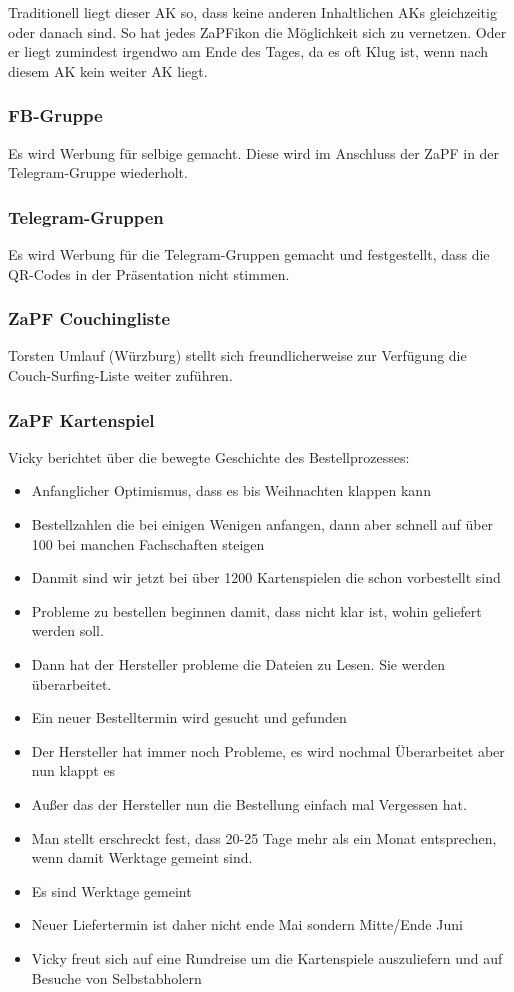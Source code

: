     Traditionell liegt dieser AK so, dass keine anderen Inhaltlichen AKs gleichzeitig oder danach sind. So hat jedes ZaPFikon die Möglichkeit sich zu vernetzen. Oder er liegt zumindest irgendwo am Ende des Tages, da es oft Klug ist, wenn nach diesem AK kein weiter AK liegt.

  \subsubsection{FB-Gruppe}
    Es wird Werbung für selbige gemacht. Diese wird im Anschluss der ZaPF in der Telegram-Gruppe wiederholt.

  \subsubsection{Telegram-Gruppen}
    Es wird Werbung für die Telegram-Gruppen gemacht und festgestellt, dass die QR-Codes in der Präsentation nicht stimmen.

  \subsubsection{ZaPF Couchingliste}
    Torsten Umlauf (Würzburg) stellt sich freundlicherweise zur Verfügung die Couch-Surfing-Liste weiter zuführen.

  \subsubsection{ZaPF Kartenspiel}
    Vicky berichtet über die bewegte Geschichte des Bestellprozesses:
    \begin{itemize}
      \item Anfanglicher Optimismus, dass es bis Weihnachten klappen kann
      \item Bestellzahlen die bei einigen Wenigen anfangen, dann aber schnell auf über 100 bei manchen Fachschaften steigen
      \item Danmit sind wir jetzt bei über 1200 Kartenspielen die schon vorbestellt sind
      \item Probleme zu bestellen beginnen damit, dass nicht klar ist, wohin geliefert werden soll.
      \item Dann hat der Hersteller probleme die Dateien zu Lesen. Sie werden überarbeitet.
      \item Ein neuer Bestelltermin wird gesucht und gefunden
      \item Der Hersteller hat immer noch Probleme, es wird nochmal Überarbeitet aber nun klappt es
      \item Außer das der Hersteller nun die Bestellung einfach mal Vergessen hat.
      \item Man stellt erschreckt fest, dass 20-25 Tage mehr als ein Monat entsprechen, wenn damit Werktage gemeint sind.
      \item Es sind Werktage gemeint
      \item Neuer Liefertermin ist daher nicht ende Mai sondern Mitte/Ende Juni
      \item Vicky freut sich auf eine Rundreise um die Kartenspiele auszuliefern und auf Besuche von Selbstabholern
    \end{itemize}

